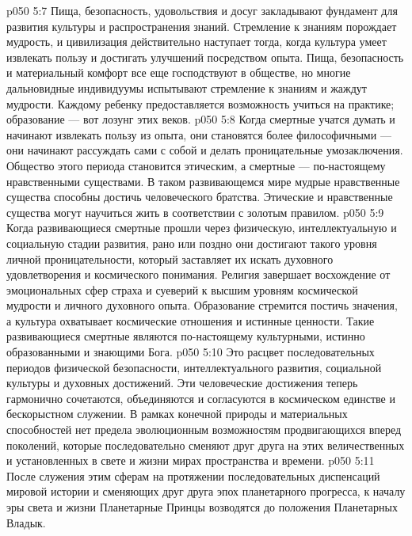 \vs p050 5:7 \pc {}\bibnobreakspace {} Пища, безопасность, удовольствия и досуг закладывают фундамент для развития культуры и распространения знаний. Стремление к знаниям порождает мудрость, и цивилизация действительно наступает тогда, когда культура умеет извлекать пользу и достигать улучшений посредством опыта. Пища, безопасность и материальный комфорт все еще господствуют в обществе, но многие дальновидные индивидуумы испытывают стремление к знаниям и жаждут мудрости. Каждому ребенку предоставляется возможность учиться на практике; образование --- вот лозунг этих веков.
\vs p050 5:8 \pc {}\bibnobreakspace {} Когда смертные учатся думать и начинают извлекать пользу из опыта, они становятся более философичными --- они начинают рассуждать сами с собой и делать проницательные умозаключения. Общество этого периода становится этическим, а смертные --- по\hyp{}настоящему нравственными существами. В таком развивающемся мире мудрые нравственные существа способны достичь человеческого братства. Этические и нравственные существа могут научиться жить в соответствии с золотым правилом.
\vs p050 5:9 \pc {}\bibnobreakspace {} Когда развивающиеся смертные прошли через физическую, интеллектуальную и социальную стадии развития, рано или поздно они достигают такого уровня личной проницательности, который заставляет их искать духовного удовлетворения и космического понимания. Религия завершает восхождение от эмоциональных сфер страха и суеверий к высшим уровням космической мудрости и личного духовного опыта. Образование стремится постичь значения, а культура охватывает космические отношения и истинные ценности. Такие развивающиеся смертные являются по\hyp{}настоящему культурными, истинно образованными и знающими Бога.
\vs p050 5:10 \pc {}\bibnobreakspace {} Это расцвет последовательных периодов физической безопасности, интеллектуального развития, социальной культуры и духовных достижений. Эти человеческие достижения теперь гармонично сочетаются, объединяются и согласуются в космическом единстве и бескорыстном служении. В рамках конечной природы и материальных способностей нет предела эволюционным возможностям продвигающихся вперед поколений, которые последовательно сменяют друг друга на этих величественных и установленных в свете и жизни мирах пространства и времени.
\vs p050 5:11 \pc После служения этим сферам на протяжении последовательных диспенсаций мировой истории и сменяющих друг друга эпох планетарного прогресса, к началу эры света и жизни Планетарные Принцы возводятся до положения Планетарных Владык.
